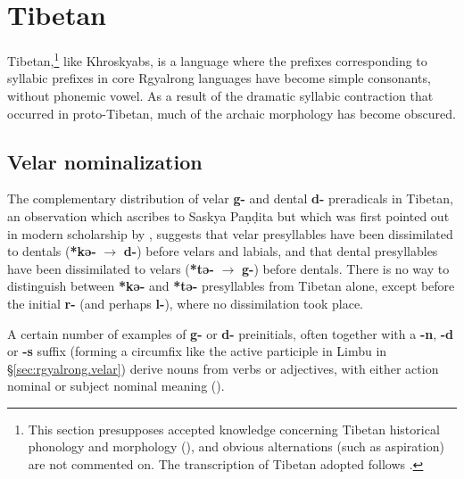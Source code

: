 \documentclass[oneside,a4paper,11pt]{article}
\newcommand{\ipa}[1]{\textbf{{\phon\mbox{#1}}}} %
\begin{document}
\section{Tibetan}
Tibetan,\footnote{This section presupposes accepted knowledge concerning Tibetan historical phonology and morphology (\citealt{lifk33, coblin76, hill11laws, hill14derivational}), and obvious alternations (such as aspiration) are not commented on. The transcription of Tibetan adopted follows \citet{jacques12transcription}.} like Khroskyabs, is a language where the prefixes corresponding to syllabic prefixes in core Rgyalrong languages have become simple consonants, without phonemic vowel. As a result of the dramatic syllabic contraction that occurred in proto-Tibetan, much of the archaic morphology has become obscured. 

\subsection{Velar nominalization} \label{sec:tibetan.velar}
The complementary distribution of velar \ipa{g-} and dental \ipa{d-} preradicals in Tibetan, an observation which \citet{hill11laws} ascribes to Saskya Paṇḍita but which was first pointed out in modern scholarship by \citet{lifk33}, suggests that velar presyllables have been dissimilated to dentals (\ipa{*kə-} $\rightarrow$ \ipa{d-}) before velars and labials, and that dental presyllables have been dissimilated to velars (\ipa{*tə-} $\rightarrow$ \ipa{g-}) before dentals. There is no way to distinguish between \ipa{*kə-} and \ipa{*tə-} presyllables from Tibetan alone, except before the initial \ipa{r-} (and perhaps \ipa{l-}), where no dissimilation took place.

A certain number of examples of \ipa{g-} or \ipa{d-} preinitials, often together with a \ipa{-n}, \ipa{-d} or \ipa{-s} suffix (forming a circumfix like the active participle in Limbu in §\ref{sec:rgyalrong.velar}) derive nouns from verbs or adjectives, with either action nominal or subject nominal meaning (\citealt{jacques14snom}). 
\end{document}
